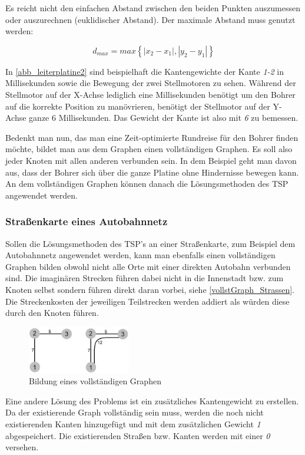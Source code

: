 \documentclass{article}
\begin{document}
Es reicht nicht den einfachen Abstand zwischen den beiden Punkten auszumessen oder auszurechnen (euklidischer Abstand). Der maximale Abstand muss genutzt werden:

\[d_{max} = max\left\{ |x_2 - x_1|, |y_2 - y_1| \right\}\]

In \autoref{abb_leiterplatine2} sind beispielhaft die Kantengewichte der Kante \textit{1-2} in Millisekunden sowie die Bewegung der zwei Stellmotoren zu sehen. Während der Stellmotor auf der X-Achse lediglich eine Millisekunden benötigt um den Bohrer auf die korrekte Position zu manövrieren, benötigt der Stellmotor auf der Y-Achse ganze 6 Millisekunden. Das Gewicht der Kante ist also mit \textit{6} zu bemessen.

Bedenkt man nun, das man eine Zeit-optimierte Rundreise für den Bohrer finden möchte, bildet man aus dem Graphen einen vollständigen Graphen. Es soll also jeder Knoten mit allen anderen verbunden sein. In dem Beispiel geht man davon aus, dass der Bohrer sich über die ganze Platine ohne Hindernisse bewegen kann. An dem vollständigen Graphen können danach die Lösungsmethoden des TSP angewendet werden.
\subsubsection{Straßenkarte eines Autobahnnetz}
Sollen die Lösungsmethoden des TSP's an einer Straßenkarte, zum Beispiel dem Autobahnnetz angewendet werden, kann man ebenfalls einen vollständigen Graphen bilden obwohl nicht alle Orte mit einer direkten Autobahn verbunden sind. Die imaginären Strecken führen dabei nicht in die Innenstadt bzw. zum Knoten selbst sondern führen direkt daran vorbei, siehe \autoref{vollstGraph_Strassen}. Die Streckenkosten der jeweiligen Teilstrecken werden addiert als würden diese durch den Knoten führen.

\begin{figure}[h]
	\centering
	\includegraphics[width=0.4\textwidth]{vollstGraph_Strassen.jpg}
	\caption{Bildung eines vollständigen Graphen}
	\label{vollstGraph_Strassen}
\end{figure}

Eine andere Lösung des Problems ist ein zusätzliches Kantengewicht zu erstellen. Da der existierende Graph vollständig sein muss, werden die noch nicht existierenden Kanten hinzugefügt und mit dem zusätzlichen Gewicht \textit{1} abgespeichert. Die existierenden Straßen bzw. Kanten werden mit einer \textit{0} versehen.
\end{document}
